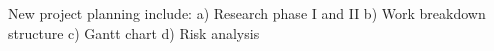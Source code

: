 

New project planning include:
a) Research phase I and II
b) Work breakdown structure
c) Gantt chart
d) Risk analysis